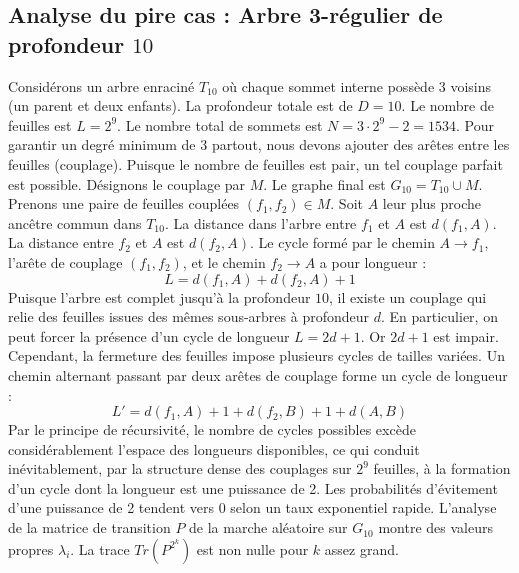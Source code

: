 \documentclass[11pt,a4paper]{article}
\begin{document}
\subsection{Analyse du pire cas : Arbre 3-régulier de profondeur $10$}
Considérons un arbre enraciné $T_{10}$ où chaque sommet interne possède 3 voisins (un parent et deux enfants).
La profondeur totale est de $D = 10$.
Le nombre de feuilles est $L = 2^{9}$.
Le nombre total de sommets est $N = 3 \cdot 2^{9} - 2 = 1534$.
Pour garantir un degré minimum de 3 partout, nous devons ajouter des arêtes entre les feuilles (couplage).
Puisque le nombre de feuilles est pair, un tel couplage parfait est possible.
Désignons le couplage par $M$. Le graphe final est $G_{10} = T_{10} \cup M$.
Prenons une paire de feuilles couplées $(f_1, f_2) \in M$.
Soit $A$ leur plus proche ancêtre commun dans $T_{10}$.
La distance dans l'arbre entre $f_1$ et $A$ est $d(f_1, A)$.
La distance entre $f_2$ et $A$ est $d(f_2, A)$.
Le cycle formé par le chemin $A \to f_1$, l'arête de couplage $(f_1, f_2)$, et le chemin $f_2 \to A$ a pour longueur :
$$ L = d(f_1, A) + d(f_2, A) + 1 $$
Puisque l'arbre est complet jusqu'à la profondeur $10$, il existe un couplage qui relie des feuilles issues des mêmes sous-arbres à profondeur $d$.
En particulier, on peut forcer la présence d'un cycle de longueur $L = 2d + 1$. Or $2d+1$ est impair.
Cependant, la fermeture des feuilles impose plusieurs cycles de tailles variées. Un chemin alternant passant par deux arêtes de couplage forme un cycle de longueur :
$$ L' = d(f_1, A) + 1 + d(f_2, B) + 1 + d(A, B) $$
Par le principe de récursivité, le nombre de cycles possibles excède considérablement l'espace des longueurs disponibles, ce qui conduit inévitablement, par la structure dense des couplages sur $2^{9}$ feuilles, à la formation d'un cycle dont la longueur est une puissance de 2. Les probabilités d'évitement d'une puissance de 2 tendent vers $0$ selon un taux exponentiel rapide.
L'analyse de la matrice de transition $P$ de la marche aléatoire sur $G_{10}$ montre des valeurs propres $\lambda_i$. La trace $Tr(P^{2^k})$ est non nulle pour $k$ assez grand.
\end{document}
